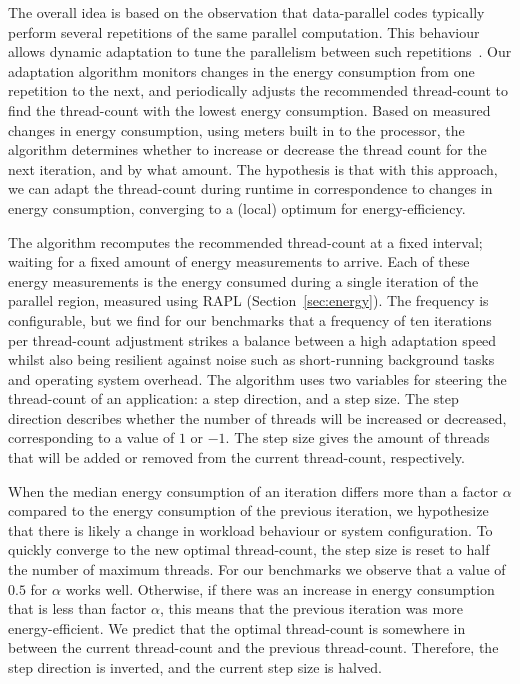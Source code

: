 \documentclass[runningheads]{llncs}
\begin{document}
The overall idea is based on the observation that data-parallel codes typically perform several repetitions of the same parallel computation.
This behaviour allows dynamic adaptation to tune the parallelism between such repetitions~\cite{gordon2015dynamic}.
Our adaptation algorithm monitors changes in the energy consumption from one repetition to the next, and periodically adjusts the recommended thread-count to find the thread-count with the lowest energy consumption.
Based on measured changes in energy consumption, using meters built in to the processor, the algorithm determines whether to increase or decrease the thread count for the next iteration, and by what amount.
The hypothesis is that with this approach, we can adapt the thread-count during runtime in correspondence to changes in energy consumption, converging to a (local) optimum for energy-efficiency.

The algorithm recomputes the recommended thread-count at a fixed interval; waiting for a fixed amount of energy measurements to arrive.
Each of these energy measurements is the energy consumed during a single iteration of the parallel region, measured using RAPL (Section~\ref{sec:energy}).
The frequency is configurable, but we find for our benchmarks that a frequency of ten iterations per thread-count adjustment strikes a balance between a high adaptation speed whilst also being resilient against noise such as short-running background tasks and operating system overhead.
The algorithm uses two variables for steering the thread-count of an application: a step direction, and a step size.
The step direction describes whether the number of threads will be increased or decreased, corresponding to a value of $1$ or $-1$.
The step size gives the amount of threads that will be added or removed from the current thread-count, respectively.

When the median energy consumption of an iteration differs more than a factor $\alpha$ compared to the energy consumption of the previous iteration, we hypothesize that there is likely a change in workload behaviour or system configuration.
To quickly converge to the new optimal thread-count, the step size is reset to half the number of maximum threads.
For our benchmarks we observe that a value of $0.5$ for $\alpha$ works well.
Otherwise, if there was an increase in energy consumption that is less than factor $\alpha$, this means that the previous iteration was more energy-efficient.
We predict that the optimal thread-count is somewhere in between the current thread-count and the previous thread-count.
Therefore, the step direction is inverted, and the current step size is halved.
\end{document}
